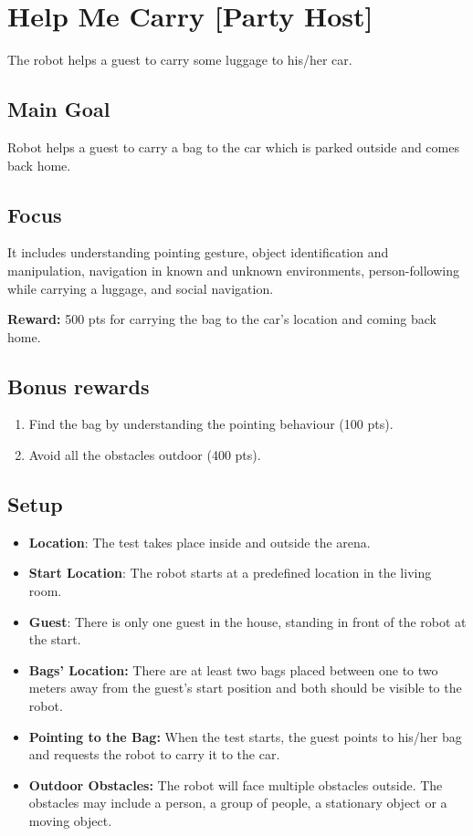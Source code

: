 \section{Help Me Carry [Party Host]}
The robot helps a guest to carry some luggage to his/her car.

\subsection{Main Goal}
Robot helps a guest to carry a bag to the car which is parked outside and comes back home.

\subsection{Focus}
It includes understanding pointing gesture, object identification and manipulation, navigation in known and unknown environments, person-following while carrying a luggage, and social navigation.

\noindent\textbf{Reward:} 500 pts for carrying the bag to the car's location and coming back home.

\subsection{Bonus rewards}
\begin{enumerate}[nosep]
	\item Find the bag by understanding the pointing behaviour (100 pts).
	\item Avoid all the obstacles outdoor (400 pts).
\end{enumerate}


\subsection{Setup}
\begin{itemize}
	\item \textbf{Location}: The test takes place inside and outside the arena.

	\item \textbf{Start Location}: The robot starts at a predefined location in the living room.

	\item \textbf{Guest}: There is only one guest in the house, standing in front of the robot at the start.
	
	\item \textbf{Bags' Location:} There are at least two bags placed between one to two meters  away from the guest's start position and both should be visible to the robot.
	
	\item \textbf{Pointing to the Bag:} When the test starts, the guest points to his/her bag and requests the robot to carry it to the car.
	
	\item \textbf{Outdoor Obstacles:} The robot will face multiple obstacles outside. The obstacles may include a person, a group of people, a stationary object or a moving object.
\end{itemize}

